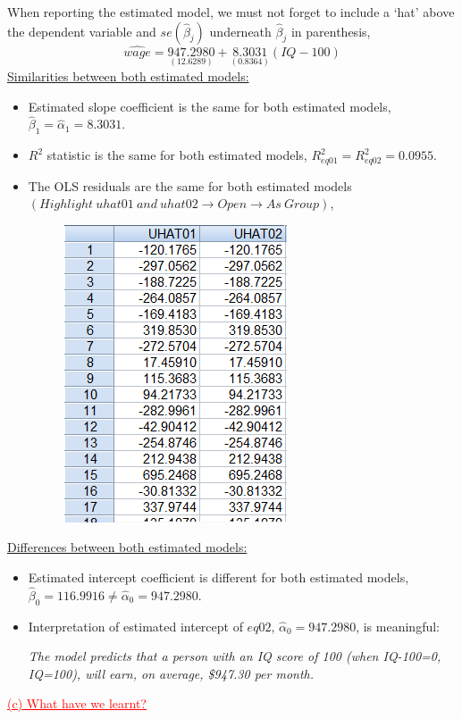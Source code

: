 \documentclass[12pt]{report}
\begin{document}
\noindent When reporting the estimated model, we must not forget to include a `hat' above the dependent variable and $se(\hat{\beta}_j)$ underneath $\hat{\beta}_j$ in parenthesis,
$$\widehat{wage} = \underset{(12.6289)}{947.2980} + \underset{(0.8364)}{8.3031}(IQ-100)$$
\noindent \underline{Similarities between both estimated models:}
\begin{itemize}
	\item Estimated slope coefficient is the same for both estimated models, $\hat{\beta}_1 = \hat{\alpha}_1 = 8.3031$.
	\item $R^2$ statistic is the same for both estimated models, $R^2_{eq01} = R^2_{eq02} = 0.0955$.
	\item The OLS residuals are the same for both estimated models $(Highlight\ uhat01\ and\ uhat02 \to Open \to As\ Group)$,
	\begin{figure}[H]
		\centering
		\includegraphics{q3_28}
	\end{figure}
\end{itemize}
\noindent \underline{Differences between both estimated models:}
\begin{itemize}
	\item Estimated intercept coefficient is different for both estimated models, $\hat{\beta}_0 = 116.9916 \neq  \hat{\alpha}_0 = 947.2980$.
	\item Interpretation of estimated intercept of $eq02$, $\hat{\alpha}_0 = 947.2980$, is meaningful: 
	
	\textit{The model predicts that a person with an IQ score of 100 (when IQ-100=0, IQ=100), will earn, on average, \$947.30 per month.}
\end{itemize}
\noindent \textcolor{red}{\underline{(c) What have we learnt?}}
\end{document}
